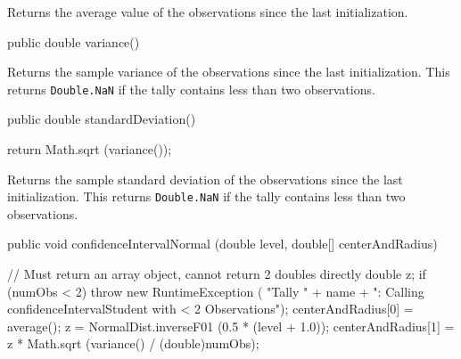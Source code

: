   \begin{tabb}  Returns the average value of the observations since the last
   initialization.
 \end{tabb}
\begin{code}

   public double variance() \begin{hide} {
      // throws NumberObservationException {
      // if (numObs < 2) throw NumberObservationException;
      if (numObs < 2) {
         //System.err.println (
         //    "******* Tally " + name + ":   calling variance() with " + numObs +
         //    " Observation");
         log.logp (Level.WARNING, "Tally", "variance",
            "Tally " + name + ":   calling variance() with " + numObs +
             " observation");
         return Double.NaN;
      }
      if (!isStable) {
         double temp = sumSquares - (sumValue * sumValue)/(double)numObs;
         temp = temp / (numObs-1);
         if (temp < 0.0) return 0.0;
         return temp;
      } else
         return curSum2 / (numObs-1);
   }\end{hide}
\end{code}
  \begin{tabb}  Returns the sample variance of the observations since the last
   initialization.
   This returns \texttt{Double.NaN}
   if the tally contains less than two observations.
 \end{tabb}
\begin{htmlonly}
\end{htmlonly}
\begin{code}

   public double standardDeviation() \begin{hide} {
      return Math.sqrt (variance());
   }\end{hide}
\end{code}
  \begin{tabb}  Returns the sample standard deviation of the observations
   since the last initialization.
   This returns \texttt{Double.NaN}
   if the tally contains less than two observations.
 \end{tabb}
\begin{htmlonly}
\end{htmlonly}
\begin{code}

   public void confidenceIntervalNormal (double level,
                                         double[] centerAndRadius) \begin{hide} {
      // Must return an array object, cannot return 2 doubles directly
      double z;
      if (numObs < 2) throw new RuntimeException (
          "Tally " + name +
          ": Calling confidenceIntervalStudent with < 2 Observations");
      centerAndRadius[0] =  average();
      z = NormalDist.inverseF01 (0.5 * (level + 1.0));
      centerAndRadius[1] = z * Math.sqrt (variance() / (double)numObs);
   }\end{hide}
\end{code}
